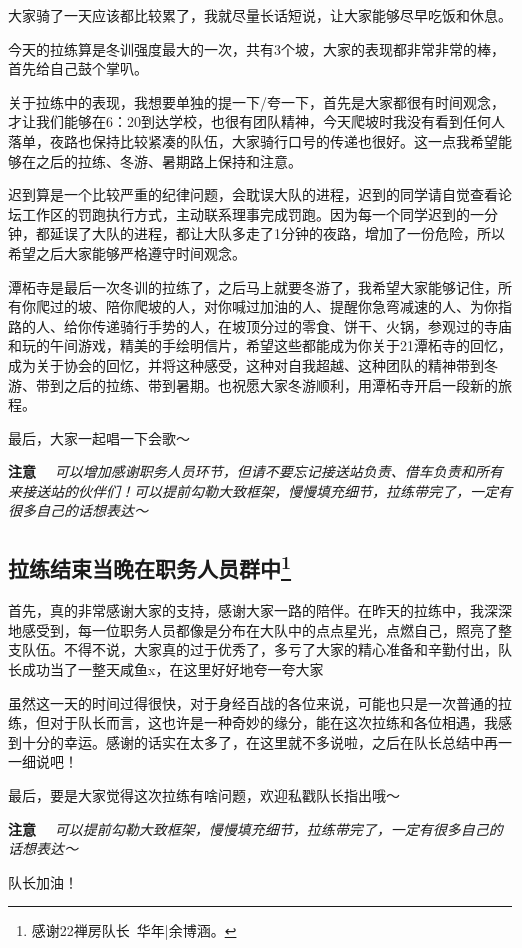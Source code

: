 \documentclass[UTF8]{ctexart}
\begin{document}
大家骑了一天应该都比较累了，我就尽量长话短说，让大家能够尽早吃饭和休息。

今天的拉练算是冬训强度最大的一次，共有3个坡，大家的表现都非常非常的棒，首先给自己鼓个掌叭。

关于拉练中的表现，我想要单独的提一下/夸一下，首先是大家都很有时间观念，才让我们能够在6：20到达学校，也很有团队精神，今天爬坡时我没有看到任何人落单，夜路也保持比较紧凑的队伍，大家骑行口号的传递也很好。这一点我希望能够在之后的拉练、冬游、暑期路上保持和注意。

迟到算是一个比较严重的纪律问题，会耽误大队的进程，迟到的同学请自觉查看论坛工作区的罚跑执行方式，主动联系理事完成罚跑。因为每一个同学迟到的一分钟，都延误了大队的进程，都让大队多走了1分钟的夜路，增加了一份危险，所以希望之后大家能够严格遵守时间观念。

潭柘寺是最后一次冬训的拉练了，之后马上就要冬游了，我希望大家能够记住，所有你爬过的坡、陪你爬坡的人，对你喊过加油的人、提醒你急弯减速的人、为你指路的人、给你传递骑行手势的人，在坡顶分过的零食、饼干、火锅，参观过的寺庙和玩的午间游戏，精美的手绘明信片，希望这些都能成为你关于21潭柘寺的回忆，成为关于协会的回忆，并将这种感受，这种对自我超越、这种团队的精神带到冬游、带到之后的拉练、带到暑期。也祝愿大家冬游顺利，用潭柘寺开启一段新的旅程。

最后，大家一起唱一下会歌～

\textbf{注意} \ \ \textit{可以增加感谢职务人员环节，但请不要忘记接送站负责、借车负责和所有来接送站的伙伴们！可以提前勾勒大致框架，慢慢填充细节，拉练带完了，一定有很多自己的话想表达～}

\subsection[拉练结束当晚在职务人员群中]{拉练结束当晚在职务人员群中\protect\footnote{感谢22禅房队长\ 华年|余博涵。}}

首先，真的非常感谢大家的支持，感谢大家一路的陪伴。在昨天的拉练中，我深深地感受到，每一位职务人员都像是分布在大队中的点点星光，点燃自己，照亮了整支队伍。不得不说，大家真的过于优秀了，多亏了大家的精心准备和辛勤付出，队长成功当了一整天咸鱼x，在这里好好地夸一夸大家~

虽然这一天的时间过得很快，对于身经百战的各位来说，可能也只是一次普通的拉练，但对于队长而言，这也许是一种奇妙的缘分，能在这次拉练和各位相遇，我感到十分的幸运。感谢的话实在太多了，在这里就不多说啦，之后在队长总结中再一一细说吧！

最后，要是大家觉得这次拉练有啥问题，欢迎私戳队长指出哦～

\textbf{注意} \ \ \textit{可以提前勾勒大致框架，慢慢填充细节，拉练带完了，一定有很多自己的话想表达～}


\center\Large{\color{red}队长加油！}
\end{document}
